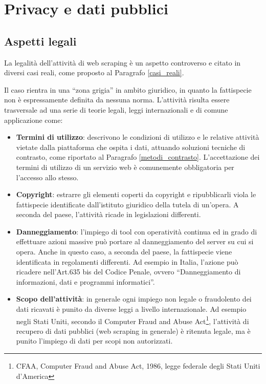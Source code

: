 \section{Privacy e dati pubblici}
\subsection{Aspetti legali}
La legalit\`a dell'attivit\`a di web scraping \`e un aspetto controverso e citato in diversi casi reali, come proposto al Paragrafo \ref{casi_reali}. 

Il caso rientra in una ``zona grigia'' in ambito giuridico, in quanto la fattispecie non \`e espressamente definita da nessuna norma.\cite{krotov2018legality}
L'attivit\`a risulta essere trasversale ad una serie di teorie legali, leggi internazionali e di comune applicazione come:
\begin{itemize}
    \item \textbf{Termini di utilizzo}: descrivono le condizioni di utilizzo e le relative attivit\`a vietate dalla piattaforma che ospita i dati, attuando soluzioni tecniche di contrasto, come riportato al Paragrafo \ref{metodi_contrasto}. L'accettazione dei termini di utilizzo di un servizio web \`e comunemente obbligatoria per l'accesso allo stesso. 
    \item \textbf{Copyright}: estrarre gli elementi coperti da copyright e ripubblicarli viola le fattispecie identificate dall'istituto giuridico della tutela di un'opera. A seconda del paese, l'attivit\`a ricade in legislazioni differenti. 
    \item \textbf{Danneggiamento}: l'impiego di tool con operativit\`a continua ed in grado di effettuare azioni massive pu\`o portare al danneggiamento del server su cui si opera. Anche in questo caso, a seconda del paese, la fattispecie viene identificata in regolamenti differenti. Ad esempio in Italia, l'azione pu\`o ricadere nell'Art.635 bis del Codice Penale, ovvero ``Danneggiamento di informazioni, dati e programmi informatici''. 
    \item \textbf{Scopo dell'attivit\`a}: in generale ogni impiego non legale o fraudolento dei dati ricavati \`e punito da diverse leggi a livello internazionale. Ad esempio negli Stati Uniti, secondo il Computer Fraud and Abuse Act\footnote{CFAA, Computer Fraud and Abuse Act, 1986, legge federale degli Stati Uniti d'America}, l'attivit\`a di recupero di dati pubblici (web scraping in generale) \`e ritenuta legale, ma \`e punito l'impiego di dati per scopi non autorizzati.
\end{itemize}
